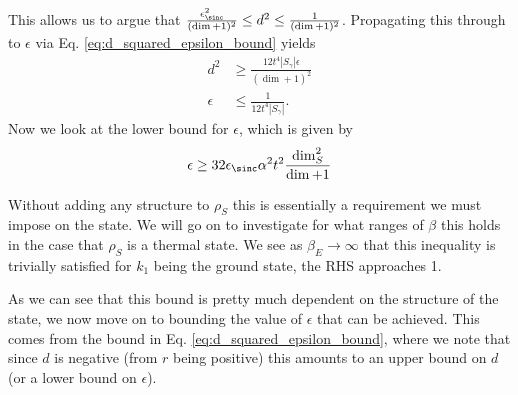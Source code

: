     This allows us to argue that $\frac{\epsilon_{\sinc}^2}{(\dim + 1)^2} \leq d^2 \leq \frac{1}{(\dim + 1)^2}$. Propagating this through to $\epsilon$ via Eq. \eqref{eq:d_squared_epsilon_bound} yields 
    \begin{align}
        d^2 &\geq \frac{12 t^4 |S_{\gamma}| \epsilon}{(\dim + 1)^2} \\
        \epsilon &\leq \frac{1}{12 t^4 |S_{\gamma}|}.
    \end{align}
    Now we look at the lower bound for $\epsilon$, which is given by 
    \begin{align}
        \epsilon \geq 32 \epsilon_{\sinc} \alpha^2 t^2 \frac{\dim_S^2}{\dim + 1}
    \end{align}
    
    
    Without adding any structure to $\rho_S$ this is essentially a requirement we must impose on the state. We will go on to investigate for what ranges of $\beta$ this holds in the case that $\rho_S$ is a thermal state. We see as $\beta_E \to \infty$ that this inequality is trivially satisfied for $k_1$ being the ground state, the RHS approaches 1.
    
    As we can see that this bound is pretty much dependent on the structure of the state, we now move on to bounding the value of $\epsilon$ that can be achieved. This comes from the bound in Eq. \eqref{eq:d_squared_epsilon_bound}, where we note that since $d$ is negative (from $r$ being positive) this amounts to an upper bound on $d$ (or a lower bound on $\epsilon$).
    